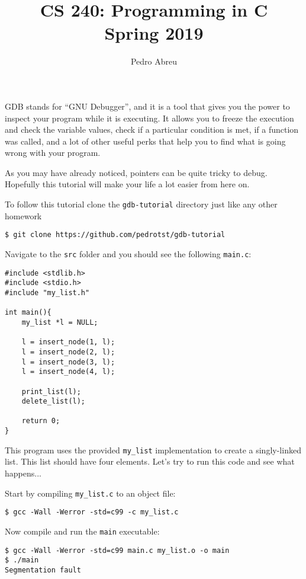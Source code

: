 \documentclass[11pt]{article}
\begin{document}
\title{CS 240: Programming in C\\ Spring 2019}
\author{Pedro Abreu}
\maketitle

GDB stands for ``GNU Debugger'', and it is a tool that gives you the
power to inspect your program while it is executing. It allows you to
freeze the execution and check the variable values, check if a particular
condition is met, if a function was called, and a lot of other useful
perks that help you to find what is going wrong with your program.

As you may have already noticed, pointers can be quite tricky to
debug. Hopefully this tutorial will make your life a lot easier from
here on.

To follow this tutorial clone the {\tt gdb-tutorial} directory just like any
other homework
\begin{verbatim}
$ git clone https://github.com/pedrotst/gdb-tutorial
\end{verbatim}

Navigate to the {\tt src} folder and you should see the following {\tt main.c}:
\begin{verbatim}
#include <stdlib.h> 
#include <stdio.h> 
#include "my_list.h" 
 
int main(){ 
    my_list *l = NULL; 
 
    l = insert_node(1, l); 
    l = insert_node(2, l); 
    l = insert_node(3, l); 
    l = insert_node(4, l); 
 
    print_list(l); 
    delete_list(l); 
 
    return 0; 
}
\end{verbatim}

This program uses the provided {\tt my_list} implementation to create
a singly-linked list. This list should have four elements. Let's try to
run this code and see what happens...

\clearpage

Start by compiling {\tt my_list.c} to an object file:
\begin{verbatim}
$ gcc -Wall -Werror -std=c99 -c my_list.c
\end{verbatim}

Now compile and run the {\tt main} executable:
\begin{verbatim}
$ gcc -Wall -Werror -std=c99 main.c my_list.o -o main
$ ./main
Segmentation fault
\end{verbatim}
\end{document}
